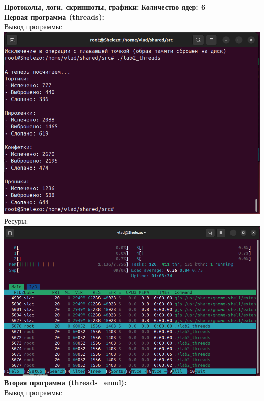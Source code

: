 \documentclass[a4paper,14pt]{extarticle}
\begin{document}
\textbf{Протоколы, логи, скриншоты, графики:}\bigbreak
\textbf{Количество ядер: 6}\\
\textbf{Первая программа (threads):}\\
Вывод программы:\\
\includegraphics[width=140mm]{threads_output_6}\\
Ресуры:\\
\includegraphics[width=140mm]{threads_resources_6}\\
\textbf{Вторая программа (threads\_emul):}\\
Вывод программы:\\
\end{document}
